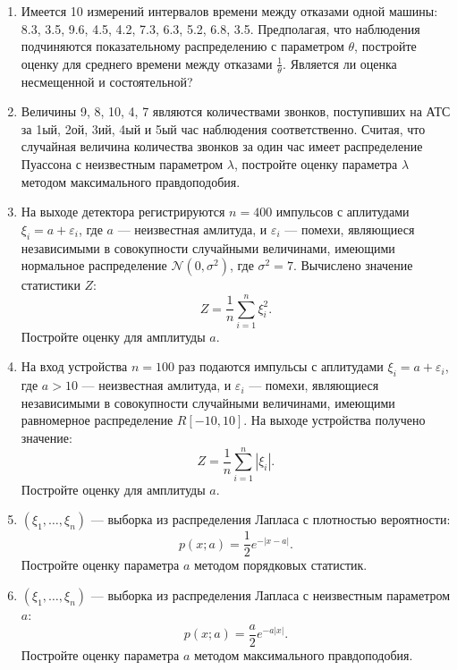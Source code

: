 \documentclass[a4paper,12pt]{article}
\newcommand{\modulus}[1]{\left | #1 \right |}
\newcommand{\sample}[2]{\left( #1_1, \dots, #1_{#2} \right)}
\begin{document}
    \begin{enumerate}[resume, topsep=1cm, parsep=1cm]
        \item Имеется 10 измерений интервалов времени между отказами одной машины: 8.3, 3.5, 9.6, 4.5, 4.2, 7.3, 6.3, 5.2, 6.8, 3.5.
              Предполагая, что наблюдения подчиняются показательному распределению с параметром $\theta$, постройте оценку для среднего времени между
              отказами $\frac{1}{\theta}$. Является ли оценка несмещенной и состоятельной?

        \item Величины 9, 8, 10, 4, 7 являются количествами звонков, поступивших на АТС за 1ый, 2ой, 3ий, 4ый и 5ый час наблюдения соответственно.
              Считая, что случайная величина количества звонков за один час имеет распределение Пуассона с неизвестным параметром $\lambda$, постройте
              оценку параметра $\lambda$ методом максимального правдоподобия.

        \item На выходе детектора регистрируются $n = 400$ импульсов с аплитудами $\xi_i = a + \varepsilon_i$, где $a$ --- неизвестная амлитуда,
              и $\varepsilon_i$ --- помехи, являющиеся независимыми в совокупности случайными величинами, имеющими нормальное распределение
              $\mathcal{N} (0, \sigma^2)$, где $\sigma^2 = 7$. Вычислено значение статистики $Z$:
              \[
                  Z = \frac{1}{n} \sum_{i=1}^n \xi_i^2.
              \]
              Постройте оценку для амплитуды $a$.

        \item На вход устройства $n = 100$ раз подаются импульсы с аплитудами $\xi_i = a + \varepsilon_i$, где $a > 10$ --- неизвестная амлитуда,
              и $\varepsilon_i$ --- помехи, являющиеся независимыми в совокупности случайными величинами, имеющими равномерное распределение
              $R[-10, 10]$. На выходе устройства получено значение:
              \[
                  Z = \frac{1}{n} \sum_{i=1}^n \modulus{\xi_i}.
              \]
              Постройте оценку для амплитуды $a$.

        \item $\sample{\xi}{n}$ --- выборка из распределения Лапласа с плотностью вероятности:
              \[
                  p(x; a)
                  = \frac{1}{2} e^{- \modulus{x-a}}.
              \]
              Постройте оценку параметра $a$ методом порядковых статистик.

        \item $\sample{\xi}{n}$ --- выборка из распределения Лапласа с неизвестным параметром $a$:
              \[
                  p(x;a)
                  = \frac{a}{2} e^{-a \modulus{x}}.
              \]
              Постройте оценку параметра $a$ методом максимального правдоподобия.


\end{enumerate}
\end{document}
